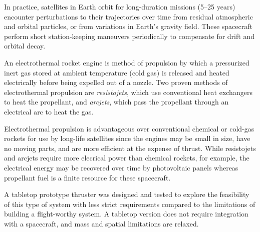 \documentclass[journal]{IEEEtran}
\begin{document}
In practice, satellites in Earth orbit for long-duration missions (5--25 years) encounter perturbations to their trajectories over time from residual atmospheric and orbital particles, or from variations in Earth's gravity field.
These spacecraft perform short station-keeping maneuvers periodically to compensate for drift and orbital decay.

An electrothermal rocket engine is method of propulsion by which a pressurized inert gas stored at ambient temperature (cold gas) is released and heated electrically before being expelled out of a nozzle.
Two proven methods of electrothermal propulsion are \emph{resistojets}, which use conventional heat exchangers to heat the propellant, and \emph{arcjets}, which pass the propellant through an electrical arc to heat the gas.

Electrothermal propulsion is advantageous over conventional chemical or cold-gas rockets for use by long-life satellites since the engines may be small in size, have no moving parts, and are more efficient at the expense of thrust.
While resistojets and arcjets require more elecrical power than chemical rockets, for example, the electrical energy may be recovered over time by photovoltaic panels whereas propellant fuel is a finite resource for these spacecraft.

A tabletop prototype thruster was designed and tested to explore the feasibility of this type of system with less strict requirements compared to the limitations of building a flight-worthy system.
A tabletop version does not require integration with a spacecraft, and mass and spatial limitations are relaxed.
\end{document}
